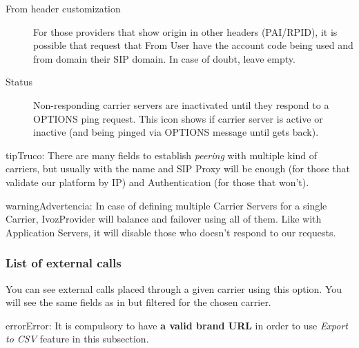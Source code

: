 \documentclass[letterpaper,10pt,spanish]{sphinxmanual}
\begin{document}
\begin{description}
\item[{From header customization}] \leavevmode{}\label{administration_portal/brand/providers/carriers:term-from-header-customization}
For those providers that show origin in other headers (PAI/RPID), it is
possible that request that From User have the account code being used
and from domain their SIP domain. In case of doubt, leave empty.

\item[{Status}] \leavevmode{}\label{administration_portal/brand/providers/carriers:term-16}
Non-responding carrier servers are inactivated until they respond to a OPTIONS ping request. This icon shows
if carrier server is active or inactive (and being pinged via OPTIONS message until gets back).

\end{description}

\begin{notice}{tip}{Truco:}
There are many fields to establish \emph{peering} with multiple kind of
carriers, but usually with the name and SIP Proxy will be enough (for
those that validate our platform by IP) and Authentication (for those that
won't).
\end{notice}

\begin{notice}{warning}{Advertencia:}
In case of defining multiple Carrier Servers for a single
Carrier, IvozProvider will balance and failover using all of them.
Like with Application Servers, it will disable those who doesn't respond to
our requests.
\end{notice}


\subsubsection{List of external calls}
\label{administration_portal/brand/providers/carriers:list-of-external-calls}
You can see external calls placed through a given carrier using this option. You will see the same fields as in
{\hyperref[administration_portal/platform/external_calls:external\string-calls]{}} but filtered for the chosen carrier.

\begin{notice}{error}{Error:}
It is compulsory to have \textbf{a valid brand URL} in order to use \emph{Export to CSV} feature in this subsection.
\end{notice}
\end{document}
